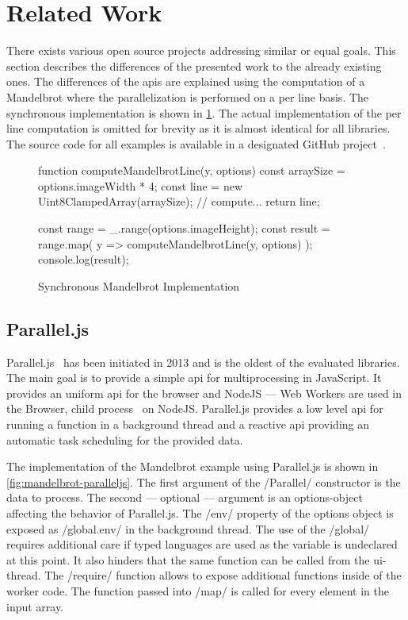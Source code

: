 \section{Related Work}\label{sec:related-work}
There exists various open source projects addressing similar or equal goals. This section describes the differences of the presented work to the already existing ones. The differences of the apis are explained using the computation of a Mandelbrot where the parallelization is performed on a per line basis. The synchronous implementation is shown in \cref{fig:mandelbrot-sync}. The actual implementation of the per line computation is omitted for brevity as it is almost identical for all libraries. The source code for all examples is available in a designated GitHub project~\cite{Reiser2016}.

\begin{figure}
	
	\begin{javascriptcode}
function computeMandelbrotLine(y, options) {
	const arraySize = options.imageWidth * 4;
	const line = new Uint8ClampedArray(arraySize);
	// compute...
	return line;
}

const range = _.range(options.imageHeight);
const result = range.map(
	y => computeMandelbrotLine(y, options)
);
console.log(result);
\end{javascriptcode}
\caption{Synchronous Mandelbrot Implementation}
\label{fig:mandelbrot-sync}
\end{figure}

\subsection{Parallel.js}
Parallel.js~\cite{SavitzkyMayr2016} has been initiated in 2013 and is the oldest of the evaluated libraries. The main goal is to provide a simple api for multiprocessing in JavaScript. It provides an uniform api for the browser and NodeJS --- Web Workers are used in the Browser, child process~\cite{childProcess} on NodeJS. Parallel.js provides a low level api for running a function in a background thread and a reactive api providing an automatic task scheduling for the provided data. 


The implementation of the Mandelbrot example using Parallel.js is shown in \cref{fig:mandelbrot-paralleljs}. The first argument of the \javascriptinline/Parallel/ constructor is the data to process. The second --- optional ---  argument is an options-object affecting the behavior of Parallel.js. The \javascriptinline/env/ property of the options object is exposed as \javascriptinline/global.env/ in the background thread. The use of the \javascriptinline/global/ requires additional care if typed languages are used as the variable is undeclared at this point. It also hinders that the same function can be called from the ui-thread. The \javascriptinline/require/ function allows to expose additional functions inside of the worker code. The function passed into \javascriptinline/map/ is called for every element in the input array.

